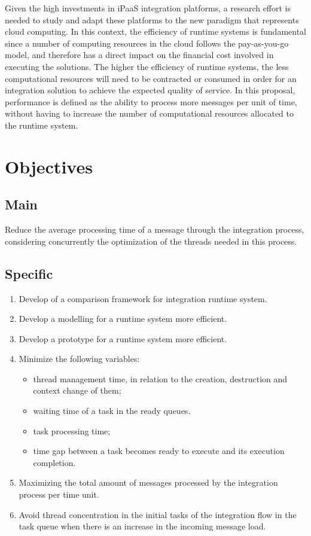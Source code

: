 Given the high investments in iPaaS integration platforms, a research effort is needed to study and adapt these platforms to the new paradigm that represents cloud computing. In this context, the efficiency of runtime systems is fundamental since a number of computing resources in the cloud follows the pay-as-you-go model, and therefore has a direct impact on the financial cost involved in executing the solutions. The higher the efficiency of runtime systems, the less computational resources will need to be contracted or consumed in order for an integration solution to achieve the expected quality of service. In this proposal, performance is defined as the ability to process more messages per unit of time, without having to increase the number of computational resources allocated to the runtime system.
\section{Objectives}

\subsection{Main}

Reduce the average processing time of a message through the integration process, considering concurrently the optimization of the threads needed in this process.

\subsection{Specific}

\begin{enumerate}%
    \item Develop of a comparison framework for integration runtime system.
    \item Develop a modelling for a runtime system more efficient.
    \item Develop a prototype for a runtime system more efficient.
	\item Minimize the following variables:
    \begin{itemize}
    	\item thread management time, in relation to the creation, destruction and context change of them;
		\item waiting time of a task in the ready queues.
		\item task processing time;
    	\item time gap between a task becomes ready to execute and its execution completion.
    \end{itemize}
	\item Maximizing the total amount of messages processed by the integration process per time unit.
		\item Avoid thread concentration in the initial tasks of the integration flow in the task queue when there is an increase in the incoming message load.
	\end{enumerate}
    
